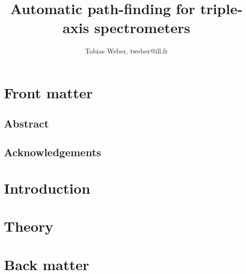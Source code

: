 \documentclass[english]{book}
\begin{document}
\newcommand{\ill}{Institut Laue-Langevin (ILL), 71 avenue des Martyrs, CS 20156, 38042 Grenoble cedex 9, France}
\newcommand{\fuh}{Fernuniversit\"at in Hagen (FUH), Universit\"atsstraße 47, 58097 Hagen, Germany}


\title{Automatic path-finding for triple-axis spectrometers}
\author{Tobias Weber, tweber@ill.fr}

\maketitle
\tableofcontents




\chapter{Front matter}
\section{Abstract}
	
\section{Acknowledgements}
	

\chapter{Introduction}


\chapter{Theory}


\chapter{Back matter}




\end{document}
